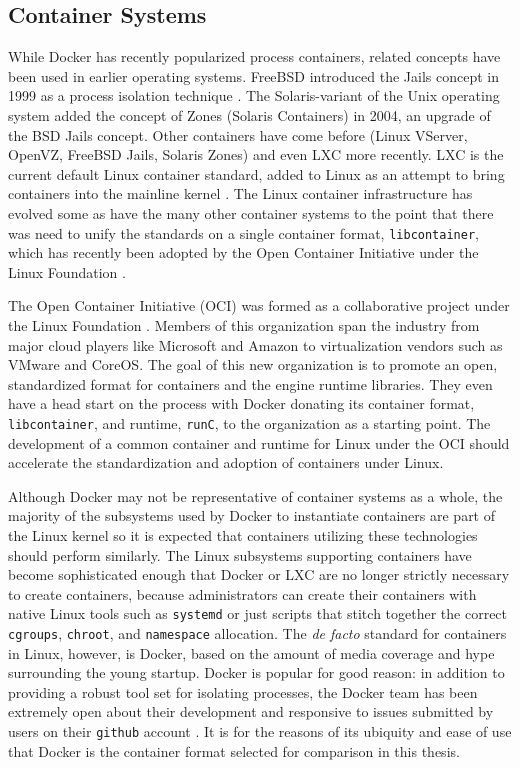 \subsection{Container Systems}
\label{sec:container_systems}
While Docker has recently popularized process containers, related concepts have been used in earlier operating systems.
FreeBSD introduced the Jails concept in 1999 as a process isolation technique \autocite{_zones_1}.  
The Solaris-variant of the Unix operating system added the concept of Zones (Solaris Containers) in 2004, an upgrade of the BSD Jails concept.  
Other containers have come before (Linux VServer, OpenVZ, FreeBSD Jails, Solaris Zones) and even LXC more recently.  
LXC is the current default Linux container standard, added to Linux as an attempt to bring containers into the mainline kernel \autocite{dockersecurity1}.
The Linux container infrastructure has evolved some as have the many other container systems to the point that there was need to unify the standards on a single container format, \texttt{libcontainer}, which has recently been adopted by the Open Container Initiative under the Linux Foundation \autocite{_oci_1}.  

The Open Container Initiative (OCI) was formed as a collaborative project under the Linux Foundation \autocite{_oci_1}.
Members of this organization span the industry from major cloud players like Microsoft and Amazon to virtualization vendors such as VMware and CoreOS.  
The goal of this new organization is to promote an open, standardized format for containers and the engine runtime libraries. 
They even have a head start on the process with Docker donating its container format, \texttt{libcontainer}, and runtime, \texttt{runC}, to the organization as a starting point.
The development of a common container and runtime for Linux under the OCI should accelerate the standardization and adoption of containers under Linux.

Although Docker may not be representative of container systems as a whole, the majority of the subsystems used by Docker to instantiate containers are part of the Linux kernel so it is expected that containers utilizing these technologies should perform similarly.  
The Linux subsystems supporting containers have become sophisticated enough that Docker or LXC are no longer strictly necessary to create containers, because administrators can create their containers with native Linux  tools such as \texttt{systemd} or just scripts that stitch together the correct \texttt{cgroups}, \texttt{chroot}, and \texttt{namespace} allocation. 
The \emph{de facto} standard for containers in Linux, however, is Docker, based on the amount of media coverage and hype surrounding the young startup.  
Docker is popular for good reason: in addition to providing a robust tool set for isolating processes, the Docker team has been extremely open about their development and responsive to issues submitted by users on their \texttt{github} account \autocite{githubdocker}.  
It is for the reasons of its ubiquity and ease of use that Docker is the container format selected for comparison in this thesis.


